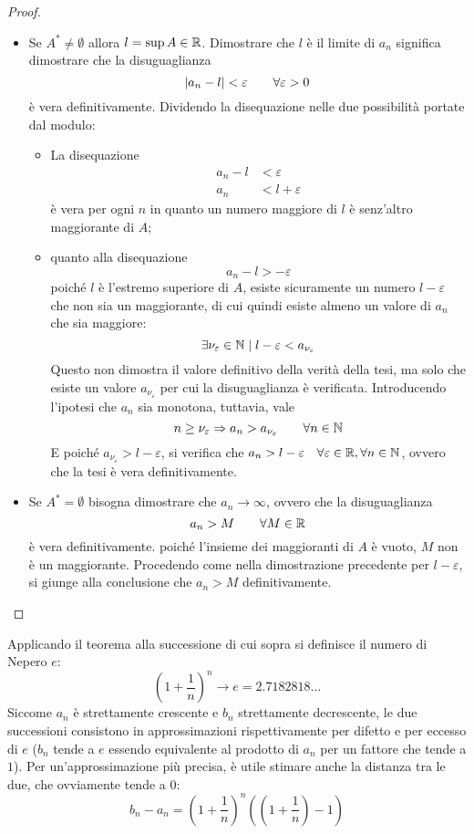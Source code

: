 \begin{proof} ~
	\begin{itemize}
		\item Se $A^*\neq\emptyset$ allora $l=\sup A\in\mathbb{R}$. Dimostrare che $l$ è il limite di $a_n$ significa dimostrare che la disuguaglianza
		      \[
			      \left\lvert a_n-l \right\rvert<\varepsilon \qquad\forall\varepsilon>0
		      \]
		      è vera definitivamente. Dividendo la disequazione nelle due possibilità portate dal modulo:
		      \begin{itemize}
			      \item La disequazione
			            \begin{align*}
				            a_n-l & < \varepsilon   \\
				            a_n   & < l+\varepsilon
			            \end{align*}
			            è vera per ogni $n$ in quanto un numero maggiore di $l$ è senz'altro maggiorante di $A$;
			      \item quanto alla disequazione
			            \begin{equation*}
				            a_n-l>-\varepsilon
			            \end{equation*}
			            poiché $l$ è l'estremo superiore di $A$, esiste sicuramente un numero $l-\varepsilon$ che non sia un maggiorante, di cui quindi esiste almeno un valore di $a_n$ che sia maggiore:
			            \[
				            \exists\nu_\varepsilon\in\mathbb{N}\mid l-\varepsilon<a_{\nu_\varepsilon}
			            \]
			            Questo non dimostra il valore definitivo della verità della tesi, ma solo che esiste un valore $a_{\nu_\varepsilon}$ per cui la disuguaglianza è verificata. Introducendo l'ipotesi che $a_n$ sia monotona, tuttavia, vale
			            \[
				            n\geq\nu_\varepsilon\Rightarrow a_n>a_{\nu_\varepsilon}\qquad\forall n\in\mathbb{N}
			            \]
			            E poiché $a_{\nu_\varepsilon}>l-\varepsilon$, si verifica che $a_n>l-\varepsilon\quad\forall\varepsilon\in\mathbb{R},\forall n\in\mathbb{N}$, ovvero che la tesi è vera definitivamente.
		      \end{itemize}
		\item Se $A^*=\emptyset$ bisogna dimostrare che $a_n\to\infty$, ovvero che la disuguaglianza
		      \[
			      a_n>M \qquad\forall M\in\mathbb{R}
		      \]
		      è vera definitivamente. poiché l'insieme dei maggioranti di $A$ è vuoto, $M$ non è un maggiorante. Procedendo come nella dimostrazione precedente per $l-\varepsilon$, si giunge alla conclusione che $a_n>M$ definitivamente.
	\end{itemize}
\end{proof}
Applicando il teorema alla successione di cui sopra si definisce il numero di Nepero $e$:
\[
	\left(1+\frac{1}{n}\right)^n\to e = 2.7182818\dots
\]
Siccome $a_n$ è strettamente crescente e $b_n$ strettamente decrescente, le due successioni consistono in approssimazioni rispettivamente per difetto e per eccesso di $e$ ($b_n$ tende a $e$ essendo equivalente al prodotto di $a_n$ per un fattore che tende a $1$). Per un'approssimazione più precisa, è utile stimare anche la distanza tra le due, che ovviamente tende a $0$:
\[
	b_n-a_n=\left(1+\frac{1}{n}\right)^n\left(\left(1+\frac{1}{n}\right)-1\right)
\]


